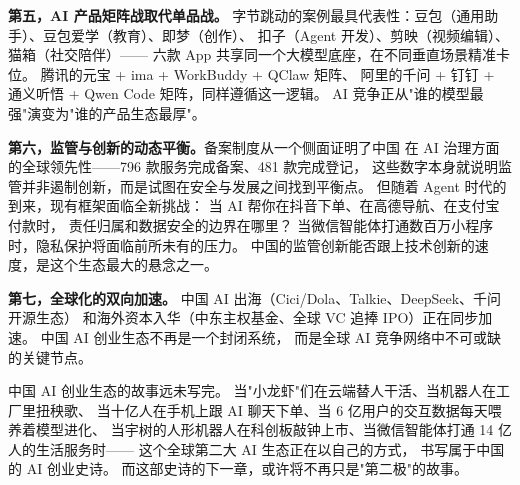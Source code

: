 \textbf{第五，AI 产品矩阵战取代单品战。}
字节跳动的案例最具代表性：豆包（通用助手）、豆包爱学（教育）、即梦（创作）、
扣子（Agent 开发）、剪映（视频编辑）、猫箱（社交陪伴）——
六款 App 共享同一个大模型底座，在不同垂直场景精准卡位。
腾讯的元宝 + ima + WorkBuddy + QClaw 矩阵、
阿里的千问 + 钉钉 + 通义听悟 + Qwen Code 矩阵，同样遵循这一逻辑。
AI 竞争正从"谁的模型最强"演变为"谁的产品生态最厚"。

\textbf{第六，监管与创新的动态平衡。}备案制度从一个侧面证明了中国
在 AI 治理方面的全球领先性——796 款服务完成备案、481 款完成登记，
这些数字本身就说明监管并非遏制创新，而是试图在安全与发展之间找到平衡点。
但随着 Agent 时代的到来，现有框架面临全新挑战：
当 AI 帮你在抖音下单、在高德导航、在支付宝付款时，
责任归属和数据安全的边界在哪里？
当微信智能体打通数百万小程序时，隐私保护将面临前所未有的压力。
中国的监管创新能否跟上技术创新的速度，是这个生态最大的悬念之一。

\textbf{第七，全球化的双向加速。}
中国 AI 出海（Cici/Dola、Talkie、DeepSeek、千问开源生态）
和海外资本入华（中东主权基金、全球 VC 追捧 IPO）正在同步加速。
中国 AI 创业生态不再是一个封闭系统，
而是全球 AI 竞争网络中不可或缺的关键节点。

中国 AI 创业生态的故事远未写完。
当"小龙虾"们在云端替人干活、当机器人在工厂里扭秧歌、
当十亿人在手机上跟 AI 聊天下单、当 6 亿用户的交互数据每天喂养着模型进化、
当宇树的人形机器人在科创板敲钟上市、当微信智能体打通 14 亿人的生活服务时——
这个全球第二大 AI 生态正在以自己的方式，
书写属于中国的 AI 创业史诗。
而这部史诗的下一章，或许将不再只是"第二极"的故事。
